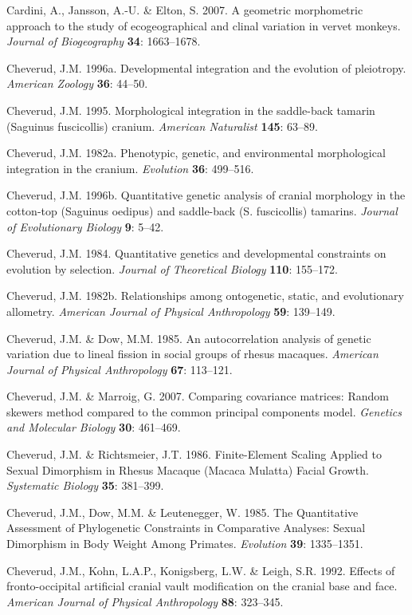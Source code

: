 \documentclass[12pt,twoside]{report}
\begin{document}
Cardini, A., Jansson, A.-U. \& Elton, S. 2007. A geometric morphometric
approach to the study of ecogeographical and clinal variation in vervet
monkeys. \emph{Journal of Biogeography} \textbf{34}: 1663--1678.

Cheverud, J.M. 1996a. Developmental integration and the evolution of
pleiotropy. \emph{American Zoology} \textbf{36}: 44--50.

Cheverud, J.M. 1995. Morphological integration in the saddle-back
tamarin (Saguinus fuscicollis) cranium. \emph{American Naturalist}
\textbf{145}: 63--89.

Cheverud, J.M. 1982a. Phenotypic, genetic, and environmental
morphological integration in the cranium. \emph{Evolution} \textbf{36}:
499--516.

Cheverud, J.M. 1996b. Quantitative genetic analysis of cranial
morphology in the cotton-top (Saguinus oedipus) and saddle-back (S.
fuscicollis) tamarins. \emph{Journal of Evolutionary Biology}
\textbf{9}: 5--42.

Cheverud, J.M. 1984. Quantitative genetics and developmental constraints
on evolution by selection. \emph{Journal of Theoretical Biology}
\textbf{110}: 155--172.

Cheverud, J.M. 1982b. Relationships among ontogenetic, static, and
evolutionary allometry. \emph{American Journal of Physical Anthropology}
\textbf{59}: 139--149.

Cheverud, J.M. \& Dow, M.M. 1985. An autocorrelation analysis of genetic
variation due to lineal fission in social groups of rhesus macaques.
\emph{American Journal of Physical Anthropology} \textbf{67}: 113--121.

Cheverud, J.M. \& Marroig, G. 2007. Comparing covariance matrices:
Random skewers method compared to the common principal components model.
\emph{Genetics and Molecular Biology} \textbf{30}: 461--469.

Cheverud, J.M. \& Richtsmeier, J.T. 1986. Finite-Element Scaling Applied
to Sexual Dimorphism in Rhesus Macaque (Macaca Mulatta) Facial Growth.
\emph{Systematic Biology} \textbf{35}: 381--399.

Cheverud, J.M., Dow, M.M. \& Leutenegger, W. 1985. The Quantitative
Assessment of Phylogenetic Constraints in Comparative Analyses: Sexual
Dimorphism in Body Weight Among Primates. \emph{Evolution} \textbf{39}:
1335--1351.

Cheverud, J.M., Kohn, L.A.P., Konigsberg, L.W. \& Leigh, S.R. 1992.
Effects of fronto-occipital artificial cranial vault modification on the
cranial base and face. \emph{American Journal of Physical Anthropology}
\textbf{88}: 323--345.
\end{document}
